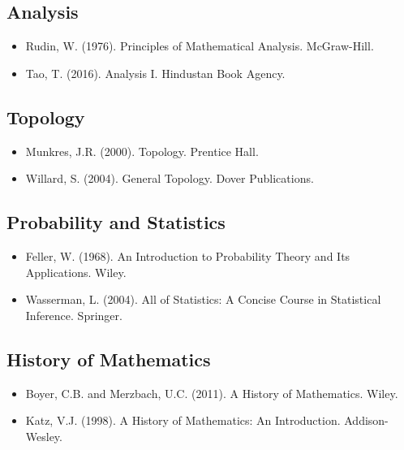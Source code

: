 \documentclass[12pt,a4paper]{article}
\begin{document}
\subsection{Analysis}

\begin{itemize}
    \item Rudin, W. (1976). Principles of Mathematical Analysis. McGraw-Hill.
    \item Tao, T. (2016). Analysis I. Hindustan Book Agency.
\end{itemize}

\subsection{Topology}

\begin{itemize}
    \item Munkres, J.R. (2000). Topology. Prentice Hall.
    \item Willard, S. (2004). General Topology. Dover Publications.
\end{itemize}

\subsection{Probability and Statistics}

\begin{itemize}
    \item Feller, W. (1968). An Introduction to Probability Theory and Its Applications. Wiley.
    \item Wasserman, L. (2004). All of Statistics: A Concise Course in Statistical Inference. Springer.
\end{itemize}

\subsection{History of Mathematics}

\begin{itemize}
    \item Boyer, C.B. and Merzbach, U.C. (2011). A History of Mathematics. Wiley.
    \item Katz, V.J. (1998). A History of Mathematics: An Introduction. Addison-Wesley.
\end{itemize}
\end{document}
